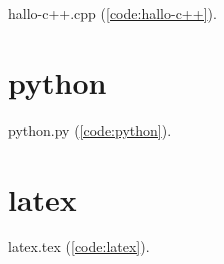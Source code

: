 hallo-c++.cpp (\autoref{code:hallo-c++}).%
%
\lstset{language=C++}%

\newpage
\section{python}

python.py (\autoref{code:python}).%
%
\lstset{language=Python}%

\newpage
\section{latex}

latex.tex (\autoref{code:latex}).%
%
\lstset{language=TeX}%

